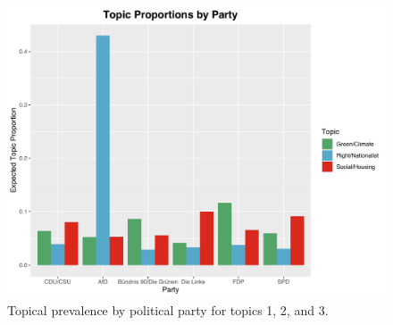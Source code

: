 \begin{figure}[h!]
  \centering
  \captionsetup{justification=centering,margin=2cm}
  \includegraphics[scale = 0.5]{../plots/appendix/4_4/beta_t134_cat.pdf}
  \caption{Topical prevalence by political party for topics 1, 2, and 3.}
  \label{fig:boat1}
\end{figure}

